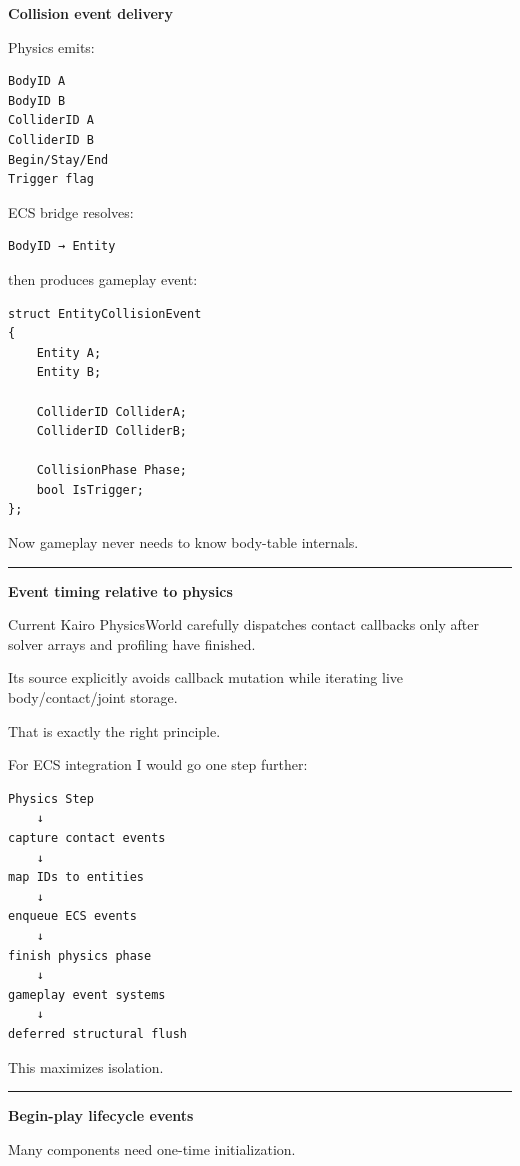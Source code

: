 \textbf{Collision event delivery}

Physics emits:

\begin{verbatim}
BodyID A
BodyID B
ColliderID A
ColliderID B
Begin/Stay/End
Trigger flag
\end{verbatim}

ECS bridge resolves:

\begin{verbatim}
BodyID → Entity
\end{verbatim}

then produces gameplay event:

\begin{verbatim}
struct EntityCollisionEvent
{
    Entity A;
    Entity B;

    ColliderID ColliderA;
    ColliderID ColliderB;

    CollisionPhase Phase;
    bool IsTrigger;
};
\end{verbatim}

Now gameplay never needs to know body-table internals.

\begin{center}\rule{0.5\linewidth}{0.5pt}\end{center}

\textbf{Event timing relative to physics}

Current Kairo PhysicsWorld carefully dispatches contact callbacks only after solver arrays and profiling have finished.

Its source explicitly avoids callback mutation while iterating live body/contact/joint storage.

That is exactly the right principle.

For ECS integration I would go one step further:

\begin{verbatim}
Physics Step
    ↓
capture contact events
    ↓
map IDs to entities
    ↓
enqueue ECS events
    ↓
finish physics phase
    ↓
gameplay event systems
    ↓
deferred structural flush
\end{verbatim}

This maximizes isolation.

\begin{center}\rule{0.5\linewidth}{0.5pt}\end{center}

\textbf{Begin-play lifecycle events}

Many components need one-time initialization.

